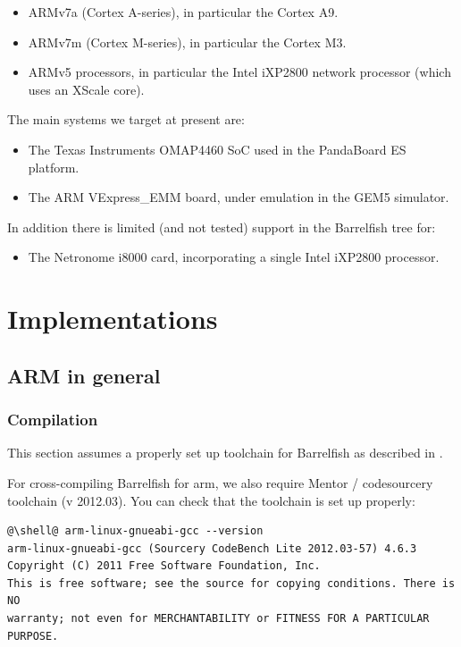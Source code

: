 \documentclass[a4paper,twoside]{report} %
\begin{document}
\begin{itemize}
\item ARMv7a (Cortex A-series), in particular the Cortex A9. 
\item ARMv7m (Cortex M-series), in particular the Cortex M3. 
\item ARMv5 processors, in particular the Intel iXP2800 network
  processor (which uses an XScale core). 
\end{itemize}

The main systems we target at present are:
\begin{itemize}
\item The Texas Instruments OMAP4460 SoC used in the PandaBoard ES
  platform. 
\item The ARM VExpress\_EMM board, under emulation in the GEM5
  simulator. 
\end{itemize}

In addition there is limited (and not tested) support in the
Barrelfish tree for:
\begin{itemize}
\item The Netronome i8000 card, incorporating a single Intel iXP2800
  processor. 
\end{itemize}


\chapter{Implementations}\label{chap:impl}

\section{ARM in general}

\subsection{Compilation}
\label{sec:armcompile}

This section assumes a properly set up toolchain for Barrelfish as
described in .

For cross-compiling Barrelfish for arm, we also require Mentor /
codesourcery toolchain (v 2012.03). You can check that the toolchain
is set up properly:

\begin{lstlisting}
@\shell@ arm-linux-gnueabi-gcc --version
arm-linux-gnueabi-gcc (Sourcery CodeBench Lite 2012.03-57) 4.6.3
Copyright (C) 2011 Free Software Foundation, Inc.
This is free software; see the source for copying conditions. There is NO
warranty; not even for MERCHANTABILITY or FITNESS FOR A PARTICULAR PURPOSE.
\end{lstlisting}
\end{document}
